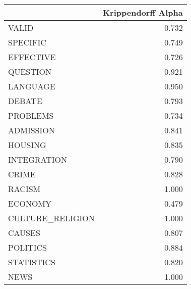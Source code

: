 \begin{tabular}{lr}
\toprule
{} &  Krippendorff Alpha \\
\midrule
VALID            &               0.732 \\
SPECIFIC         &               0.749 \\
EFFECTIVE        &               0.726 \\
QUESTION         &               0.921 \\
LANGUAGE         &               0.950 \\
DEBATE           &               0.793 \\
PROBLEMS         &               0.734 \\
ADMISSION        &               0.841 \\
HOUSING          &               0.835 \\
INTEGRATION      &               0.790 \\
CRIME            &               0.828 \\
RACISM           &               1.000 \\
ECONOMY          &               0.479 \\
CULTURE\_RELIGION &               1.000 \\
CAUSES           &               0.807 \\
POLITICS         &               0.884 \\
STATISTICS       &               0.820 \\
NEWS             &               1.000 \\
\bottomrule
\end{tabular}
